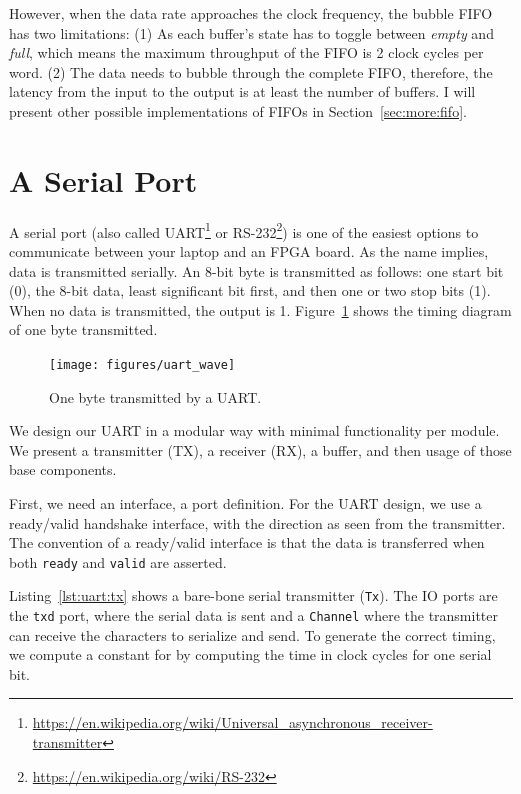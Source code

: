 \documentclass[%
    10pt,
    headinclude, footexclude,
    openright, %
    notitlepage,
    cleardoubleempty,
    headsepline,
    pointlessnumbers,
    bibtotoc, idxtotoc,
    ]{scrbook}
\newcommand{\code}[1]{{\small{\texttt{#1}}}}
\newcommand{\myref}[2]{\href{#1}{#2}}
\renewcommand{\myref}[2]{{#2}{\footnote{\url{#1}}}}
\begin{document}
However, when the data rate approaches the clock frequency, the bubble FIFO
has two limitations: (1) As each buffer's state has to toggle between \emph{empty} and
\emph{full}, which means the maximum throughput of the FIFO is 2 clock cycles
per word. (2) The data needs to bubble through the complete FIFO, therefore,
the latency from the input to the output is at least the number of buffers.
I will present other possible implementations of FIFOs in Section~\ref{sec:more:fifo}.

\section{A Serial Port}
\label{sec:uart}

A serial port (also called
\myref{https://en.wikipedia.org/wiki/Universal_asynchronous_receiver-transmitter}{UART}
or \myref{https://en.wikipedia.org/wiki/RS-232}{RS-232}) is one of the easiest options
to communicate between your laptop and an FPGA board.
As the name implies, data is transmitted serially. An 8-bit byte is transmitted as follows:
one start bit (0), the 8-bit data, least significant bit first, and then one or two stop
bits (1). When no data is transmitted, the output is 1.
Figure~\ref{fig:uart:wave} shows the timing diagram of one byte transmitted.

\begin{figure}
  \centering
  \texttt{[image: figures/uart\_wave]}
  \caption{One byte transmitted by a UART.}
  \label{fig:uart:wave}
\end{figure}

We design our UART in a modular way with minimal functionality
per module. We present a transmitter (TX), a receiver (RX),
a buffer, and then usage of those base components.

First, we need an interface, a port definition.
For the UART design, we use a ready/valid handshake interface,
with the direction as seen from the transmitter.
The convention of a ready/valid interface is that the data is transferred
when both \code{ready} and \code{valid} are asserted.


Listing~\ref{lst:uart:tx} shows a bare-bone serial transmitter (\code{Tx}).
The IO ports are the \code{txd} port, where the serial data is sent and
a \code{Channel} where the transmitter can receive the characters to serialize
and send.
To generate the correct timing, we compute a constant for by computing
the time in clock cycles for one serial bit.
\end{document}
